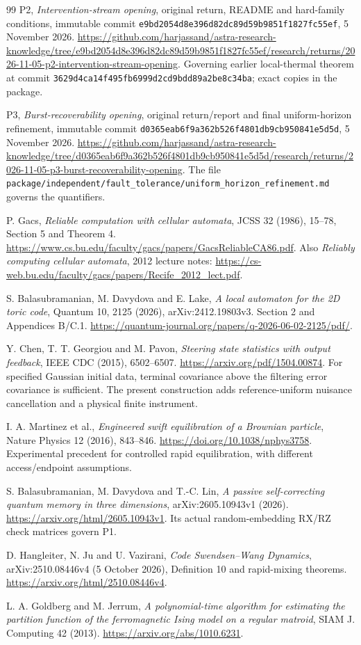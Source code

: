 \documentclass[11pt,a4paper]{article}
\begin{document}
\begin{thebibliography}{99}\small
{}
P2, \emph{Intervention-stream opening}, original return, README and hard-family conditions, immutable commit \texttt{e9bd2054d8e396d82dc89d59b9851f1827fc55ef}, 5 November 2026.
\url{https://github.com/harjassand/astra-research-knowledge/tree/e9bd2054d8e396d82dc89d59b9851f1827fc55ef/research/returns/2026-11-05-p2-intervention-stream-opening}.
Governing earlier local-thermal theorem at commit \texttt{3629d4ca14f495fb6999d2cd9bdd89a2be8c34ba}; exact copies in the package.

P3, \emph{Burst-recoverability opening}, original return/report and final uniform-horizon refinement, immutable commit \texttt{d0365eab6f9a362b526f4801db9cb950841e5d5d}, 5 November 2026.
\url{https://github.com/harjassand/astra-research-knowledge/tree/d0365eab6f9a362b526f4801db9cb950841e5d5d/research/returns/2026-11-05-p3-burst-recoverability-opening}.
The file \texttt{package/independent/fault\_tolerance/uniform\_horizon\_refinement.md} governs the quantifiers.

P. Gacs, \emph{Reliable computation with cellular automata}, JCSS 32 (1986), 15--78, Section 5 and Theorem 4.
\url{https://www.cs.bu.edu/faculty/gacs/papers/GacsReliableCA86.pdf}.
Also \emph{Reliably computing cellular automata}, 2012 lecture notes:
\url{https://cs-web.bu.edu/faculty/gacs/papers/Recife_2012_lect.pdf}.

S. Balasubramanian, M. Davydova and E. Lake, \emph{A local automaton for the 2D toric code}, Quantum 10, 2125 (2026), arXiv:2412.19803v3. Section 2 and Appendices B/C.1.
\url{https://quantum-journal.org/papers/q-2026-06-02-2125/pdf/}.

Y. Chen, T. T. Georgiou and M. Pavon, \emph{Steering state statistics with output feedback}, IEEE CDC (2015), 6502--6507.
\url{https://arxiv.org/pdf/1504.00874}.
For specified Gaussian initial data, terminal covariance above the filtering error covariance is sufficient. The present construction adds reference-uniform nuisance cancellation and a physical finite instrument.

I. A. Martinez et al., \emph{Engineered swift equilibration of a Brownian particle}, Nature Physics 12 (2016), 843--846.
\url{https://doi.org/10.1038/nphys3758}.
Experimental precedent for controlled rapid equilibration, with different access/endpoint assumptions.

S. Balasubramanian, M. Davydova and T.-C. Lin, \emph{A passive self-correcting quantum memory in three dimensions}, arXiv:2605.10943v1 (2026).
\url{https://arxiv.org/html/2605.10943v1}.
Its actual random-embedding RX/RZ check matrices govern P1.

D. Hangleiter, N. Ju and U. Vazirani, \emph{Code Swendsen--Wang Dynamics}, arXiv:2510.08446v4 (5 October 2026), Definition 10 and rapid-mixing theorems.
\url{https://arxiv.org/html/2510.08446v4}.

L. A. Goldberg and M. Jerrum, \emph{A polynomial-time algorithm for estimating the partition function of the ferromagnetic Ising model on a regular matroid}, SIAM J. Computing 42 (2013).
\url{https://arxiv.org/abs/1010.6231}.
\end{thebibliography}
\end{document}
